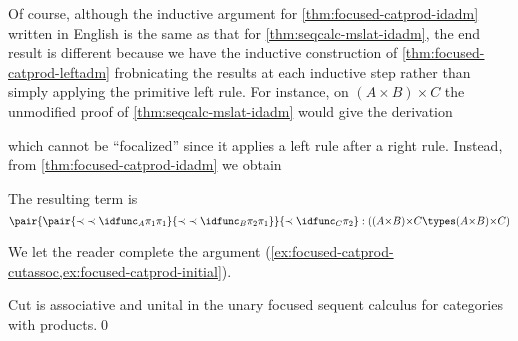 Of course, although the inductive argument for \cref{thm:focused-catprod-idadm} written in English is the same as that for \cref{thm:seqcalc-mslat-idadm}, the end result is different because we have the inductive construction of \cref{thm:focused-catprod-leftadm} frobnicating the results at each inductive step rather than simply applying the primitive left rule.
For instance, on $(A\times B)\times C$ the unmodified proof of \cref{thm:seqcalc-mslat-idadm} would give the derivation
\begin{mathpar}
\end{mathpar}
which cannot be ``focalized'' since it applies a left rule after a right rule.
Instead, from \cref{thm:focused-catprod-idadm} we obtain
\begin{mathpar}
\end{mathpar}
The resulting term is
\[ \pair{\pair{\prec{\prec{\idfunc_A}{\pi_1}}{\pi_1}}{\prec{\prec{\idfunc_B}{\pi_2}}{\pi_1}}}{\prec{\idfunc_C}{\pi_2}} :
({(A\times B)\times C \types (A\times B)\times C})\]

We let the reader complete the argument (\cref{ex:focused-catprod-cutassoc,ex:focused-catprod-initial}).

\begin{lem}\label{thm:focused-catprod-cutassoc}
  Cut is associative and unital in the unary focused sequent calculus for categories with products.\qed
\end{lem}

